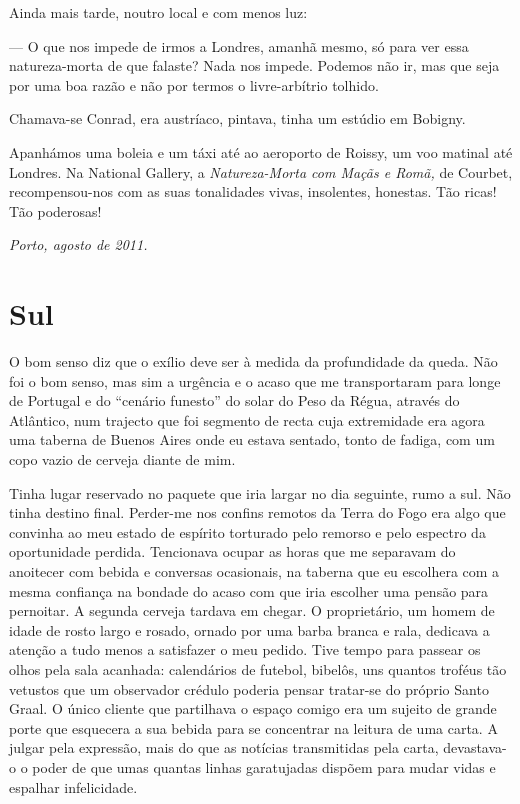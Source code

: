 Ainda mais tarde, noutro local e com menos luz:

--- O que nos impede de irmos a Londres, amanhã mesmo, só para ver essa
  natureza-morta de que falaste? Nada nos impede. Podemos não ir, mas
  que seja por uma boa razão e não por termos o livre-arbítrio tolhido.

Chamava-se Conrad, era austríaco, pintava, tinha um estúdio em
Bobigny.

\pagebreak
Apanhámos uma boleia e um táxi até ao aeroporto de Roissy, um voo
matinal até Londres. Na National Gallery, a \emph{Natureza-Morta com
Maçãs e Romã, }de Courbet, recompensou-nos com as suas tonalidades
vivas, insolentes, honestas. Tão ricas! Tão poderosas!

\begin{flushright}
\emph{Porto, agosto de 2011.}
\end{flushright}

\chapter{Sul}

O bom senso diz que o exílio deve ser à medida da profundidade da queda.
Não foi o bom senso, mas sim a urgência e o acaso
que me transportaram para longe de Portugal e do ``cenário
funesto'' do solar do Peso da Régua, através do Atlântico, num trajecto
que foi segmento de recta cuja extremidade era agora uma taberna de
Buenos Aires onde eu estava sentado, tonto de fadiga, com um copo vazio
de cerveja diante de mim.

Tinha lugar reservado no paquete que iria largar no dia seguinte, rumo a
sul. Não tinha destino final. Perder-me nos confins remotos da Terra do
Fogo era algo que convinha ao meu estado de espírito torturado pelo
remorso e pelo espectro da oportunidade perdida. Tencionava ocupar as
horas que me separavam do anoitecer com bebida e conversas ocasionais,
na taberna que eu escolhera com a mesma confiança na bondade do acaso
com que iria escolher uma pensão para pernoitar. A segunda cerveja
tardava em chegar. O proprietário, um homem de idade de rosto largo e
rosado, ornado por uma barba branca e rala, dedicava a atenção a tudo
menos a satisfazer o meu pedido. Tive tempo para passear os olhos pela
sala acanhada:
calendários de futebol, bibelôs, uns quantos troféus tão vetustos que
um observador crédulo poderia pensar tratar-se do próprio Santo Graal. O
único cliente que partilhava o espaço comigo era um sujeito de grande
porte que esquecera a sua bebida para se concentrar na leitura de uma
carta. A julgar pela expressão, mais do que as notícias transmitidas
pela carta, devastava-o o poder de que umas quantas linhas garatujadas
dispõem para mudar vidas e espalhar infelicidade.

